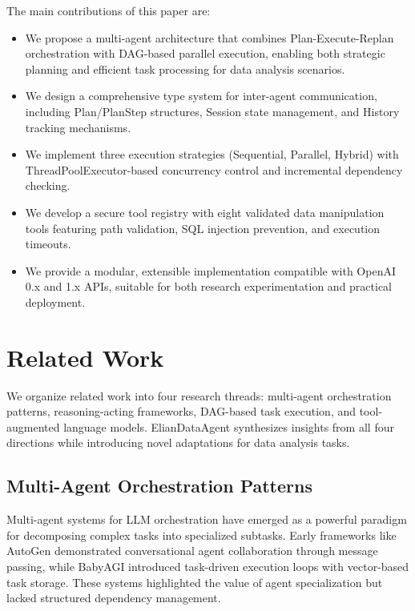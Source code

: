 \documentclass{article}
\theoremstyle{definition}
\begin{document}
The main contributions of this paper are:
\begin{itemize}[leftmargin=*, align=left]
    \item We propose a multi-agent architecture that combines Plan-Execute-Replan orchestration with DAG-based parallel execution, enabling both strategic planning and efficient task processing for data analysis scenarios.
    \item We design a comprehensive type system for inter-agent communication, including Plan/PlanStep structures, Session state management, and History tracking mechanisms.
    \item We implement three execution strategies (Sequential, Parallel, Hybrid) with ThreadPoolExecutor-based concurrency control and incremental dependency checking.
    \item We develop a secure tool registry with eight validated data manipulation tools featuring path validation, SQL injection prevention, and execution timeouts.
    \item We provide a modular, extensible implementation compatible with OpenAI 0.x and 1.x APIs, suitable for both research experimentation and practical deployment.
\end{itemize}


\section{Related Work}

We organize related work into four research threads: multi-agent orchestration patterns, reasoning-acting frameworks, DAG-based task execution, and tool-augmented language models. ElianDataAgent synthesizes insights from all four directions while introducing novel adaptations for data analysis tasks.

\subsection{Multi-Agent Orchestration Patterns}

Multi-agent systems for LLM orchestration have emerged as a powerful paradigm for decomposing complex tasks into specialized subtasks. Early frameworks like AutoGen \cite{wu2023autogen} demonstrated conversational agent collaboration through message passing, while BabyAGI \cite{babyagi2023} introduced task-driven execution loops with vector-based task storage. These systems highlighted the value of agent specialization but lacked structured dependency management.
\end{document}
